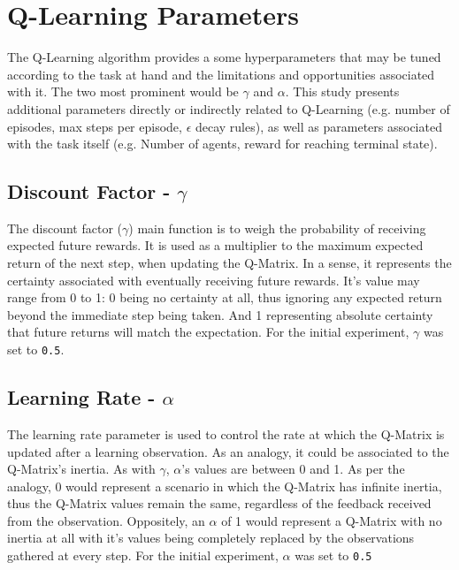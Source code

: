 \documentclass[11pt]{article}
\begin{document}
\section{Q-Learning Parameters}
    The Q-Learning algorithm provides a some hyperparameters that may be tuned according to the task at hand and the limitations and opportunities associated with it. The two most prominent would be $\gamma$ and $\alpha$. This study presents additional parameters directly or indirectly related to Q-Learning (e.g. number of episodes, max steps per episode, $\epsilon$ decay rules), as well as parameters associated with the task itself (e.g. Number of agents, reward for reaching terminal state).

    \subsection{Discount Factor - $\gamma$}
        The discount factor ($\gamma$) main function is to weigh the probability of receiving expected future rewards. It is used as a multiplier to the maximum expected return of the next step, when updating the Q-Matrix. In a sense, it represents the certainty associated with eventually receiving future rewards. It's value may range from 0 to 1: 0 being no certainty at all, thus ignoring any expected return beyond the immediate step being taken. And 1 representing absolute certainty that future returns will match the expectation. For the initial experiment, $\gamma$ was set to \texttt{0.5}.

    \subsection{Learning Rate - $\alpha$}
        The learning rate parameter is used to control the rate at which the Q-Matrix is updated after a learning observation. As an analogy, it could be associated to the Q-Matrix's inertia. As with $\gamma$, $\alpha$'s values are between 0 and 1. As per the analogy, 0 would represent a scenario in which the Q-Matrix has infinite inertia, thus the Q-Matrix values remain the same, regardless of the feedback received from the observation. Oppositely, an $\alpha$ of 1 would represent a Q-Matrix with no inertia at all with it's values being completely replaced by the observations gathered at every step. For the initial experiment, $\alpha$ was set to \texttt{0.5}
\end{document}
